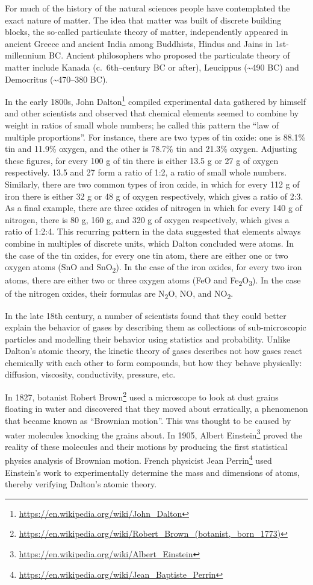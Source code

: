 \documentclass[
]{book}
\renewcommand{\href}[2]{#2\footnote{\url{#1}}}
\begin{document}
For much of the history of the natural sciences people have contemplated the exact nature of matter. The idea that matter was built of discrete building blocks, the so-called particulate theory of matter, independently appeared in ancient Greece and ancient India among Buddhists, Hindus and Jains in 1st-millennium BC. Ancient philosophers who proposed the particulate theory of matter include Kanada (c.~6th--century BC or after), Leucippus (\textasciitilde490 BC) and Democritus (\textasciitilde470--380 BC).

In the early 1800s, \href{https://en.wikipedia.org/wiki/John_Dalton}{John Dalton} compiled experimental data gathered by himself and other scientists and observed that chemical elements seemed to combine by weight in ratios of small whole numbers; he called this pattern the ``law of multiple proportions''. For instance, there are two types of tin oxide: one is 88.1\% tin and 11.9\% oxygen, and the other is 78.7\% tin and 21.3\% oxygen. Adjusting these figures, for every 100 g of tin there is either 13.5 g or 27 g of oxygen respectively. 13.5 and 27 form a ratio of 1:2, a ratio of small whole numbers. Similarly, there are two common types of iron oxide, in which for every 112 g of iron there is either 32 g or 48 g of oxygen respectively, which gives a ratio of 2:3. As a final example, there are three oxides of nitrogen in which for every 140 g of nitrogen, there is 80 g, 160 g, and 320 g of oxygen respectively, which gives a ratio of 1:2:4. This recurring pattern in the data suggested that elements always combine in multiples of discrete units, which Dalton concluded were atoms. In the case of the tin oxides, for every one tin atom, there are either one or two oxygen atoms (SnO and SnO\textsubscript{2}). In the case of the iron oxides, for every two iron atoms, there are either two or three oxygen atoms (FeO and Fe\textsubscript{2}O\textsubscript{3}). In the case of the nitrogen oxides, their formulas are N\textsubscript{2}O, NO, and NO\textsubscript{2}.

In the late 18th century, a number of scientists found that they could better explain the behavior of gases by describing them as collections of sub-microscopic particles and modelling their behavior using statistics and probability. Unlike Dalton's atomic theory, the kinetic theory of gases describes not how gases react chemically with each other to form compounds, but how they behave physically: diffusion, viscosity, conductivity, pressure, etc.

In 1827, botanist \href{https://en.wikipedia.org/wiki/Robert_Brown_(botanist,_born_1773)}{Robert Brown} used a microscope to look at dust grains floating in water and discovered that they moved about erratically, a phenomenon that became known as ``Brownian motion''. This was thought to be caused by water molecules knocking the grains about. In 1905, \href{https://en.wikipedia.org/wiki/Albert_Einstein}{Albert Einstein} proved the reality of these molecules and their motions by producing the first statistical physics analysis of Brownian motion. French physicist \href{https://en.wikipedia.org/wiki/Jean_Baptiste_Perrin}{Jean Perrin} used Einstein's work to experimentally determine the mass and dimensions of atoms, thereby verifying Dalton's atomic theory.
\end{document}
